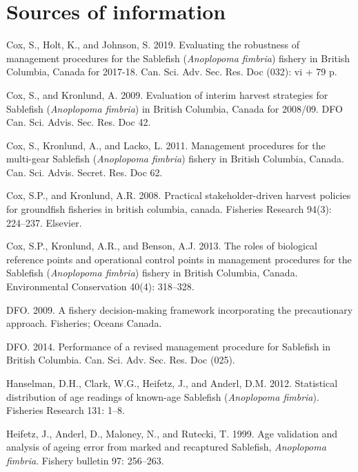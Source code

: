 \documentclass[11pt]{book}
\begin{document}
\hypertarget{sources-of-information}{%
\section{Sources of information}\label{sources-of-information}}

\hypertarget{refs}{}
\leavevmode\hypertarget{ref-cox2019evaluating}{}%
Cox, S., Holt, K., and Johnson, S. 2019. Evaluating the robustness of management procedures for the Sablefish (\emph{Anoplopoma fimbria}) fishery in British Columbia, Canada for 2017-18. Can. Sci. Adv. Sec. Res. Doc (032): vi + 79 p.

\leavevmode\hypertarget{ref-cox2009evaluation}{}%
Cox, S., and Kronlund, A. 2009. Evaluation of interim harvest strategies for Sablefish (\emph{Anoplopoma fimbria}) in British Columbia, Canada for 2008/09. DFO Can. Sci. Advis. Sec. Res. Doc 42.

\leavevmode\hypertarget{ref-cox2011management}{}%
Cox, S., Kronlund, A., and Lacko, L. 2011. Management procedures for the multi-gear Sablefish (\emph{Anoplopoma fimbria}) fishery in British Columbia, Canada. Can. Sci. Advis. Secret. Res. Doc 62.

\leavevmode\hypertarget{ref-cox2008practical}{}%
Cox, S.P., and Kronlund, A.R. 2008. Practical stakeholder-driven harvest policies for groundfish fisheries in british columbia, canada. Fisheries Research 94(3): 224--237. Elsevier.

\leavevmode\hypertarget{ref-cox2013roles}{}%
Cox, S.P., Kronlund, A.R., and Benson, A.J. 2013. The roles of biological reference points and operational control points in management procedures for the Sablefish (\emph{Anoplopoma fimbria}) fishery in British Columbia, Canada. Environmental Conservation 40(4): 318--328.

\leavevmode\hypertarget{ref-DFO2009}{}%
DFO. 2009. A fishery decision-making framework incorporating the precautionary approach. Fisheries; Oceans Canada.

\leavevmode\hypertarget{ref-dfo2014performanc}{}%
DFO. 2014. Performance of a revised management procedure for Sablefish in British Columbia. Can. Sci. Adv. Sec. Res. Doc (025).

\leavevmode\hypertarget{ref-hanselman2012statistical}{}%
Hanselman, D.H., Clark, W.G., Heifetz, J., and Anderl, D.M. 2012. Statistical distribution of age readings of known-age Sablefish (\emph{Anoplopoma fimbria}). Fisheries Research 131: 1--8.

\leavevmode\hypertarget{ref-heifetz1999age}{}%
Heifetz, J., Anderl, D., Maloney, N., and Rutecki, T. 1999. Age validation and analysis of ageing error from marked and recaptured Sablefish, \emph{Anoplopoma fimbria}. Fishery bulletin 97: 256--263.
\end{document}
